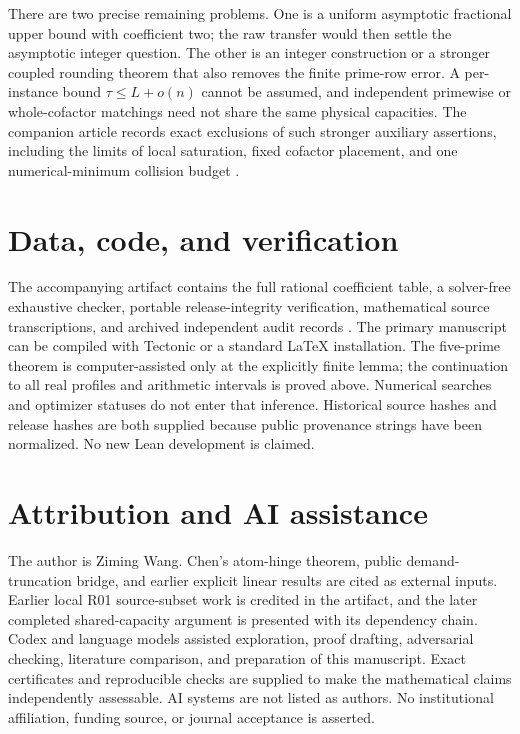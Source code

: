 \documentclass[11pt,a4paper]{article}
\begin{document}
There are two precise remaining problems. One is a uniform asymptotic fractional upper bound with coefficient two; the raw transfer would then settle the asymptotic integer question. The other is an integer construction or a stronger coupled rounding theorem that also removes the finite prime-row error. A per-instance bound $\tau\le L+o(n)$ cannot be assumed, and independent primewise or whole-cofactor matchings need not share the same physical capacities. The companion article records exact exclusions of such stronger auxiliary assertions, including the limits of local saturation, fixed cofactor placement, and one numerical-minimum collision budget \cite{WangCompanion}.

\section*{Data, code, and verification}
The accompanying artifact contains the full rational coefficient table, a solver-free exhaustive checker, portable release-integrity verification, mathematical source transcriptions, and archived independent audit records \cite{WangArtifact}. The primary manuscript can be compiled with Tectonic or a standard LaTeX installation. The five-prime theorem is computer-assisted only at the explicitly finite lemma; the continuation to all real profiles and arithmetic intervals is proved above. Numerical searches and optimizer statuses do not enter that inference. Historical source hashes and release hashes are both supplied because public provenance strings have been normalized. No new Lean development is claimed.

\section*{Attribution and AI assistance}
The author is Ziming Wang. Chen's atom-hinge theorem, public demand-truncation bridge, and earlier explicit linear results are cited as external inputs. Earlier local R01 source-subset work is credited in the artifact, and the later completed shared-capacity argument is presented with its dependency chain. Codex and language models assisted exploration, proof drafting, adversarial checking, literature comparison, and preparation of this manuscript. Exact certificates and reproducible checks are supplied to make the mathematical claims independently assessable. AI systems are not listed as authors. No institutional affiliation, funding source, or journal acceptance is asserted.
\end{document}
